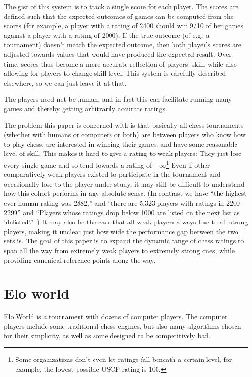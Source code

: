 \documentclass[10pt,preprint,twocolumn]{acmart}
\begin{document}
The gist of this system is to track a single score for each player.
The scores are defined such that the expected outcomes of games can be
computed from the scores (for example, a player with a rating of 2400
should win 9/10 of her games against a player with a rating of 2000).
If the true outcome (of e.g.~a tournament) doesn't match the expected
outcome, then both player's scores are adjusted towards values that
would have produced the expected result. Over time, scores thus become
a more accurate reflection of players' skill, while also allowing for
players to change skill level. This system is carefully described
elsewhere, so we can just leave it at that.

The players need not be human, and in fact this can facilitate running
many games and thereby getting arbitrarily accurate ratings.

The problem this paper is concerned with is that basically all chess
tournaments (whether with humans or computers or both) are between
players who know how to play chess, are interested in winning their
games, and have some reasonable level of skill. This makes it hard to
give a rating to weak players: They just lose every single game and so
tend towards a rating of $-\infty$\footnote{Some organizations don't
  even let ratings fall beneath a certain level, for example, the
  lowest possible USCF rating is 100.} Even if other comparatively
weak players existed to participate in the tournament and occasionally
lose to the player under study, it may still be difficult to
understand how this cohort performs in any absolute sense. (In
contrast we have ``the highest ever human rating was 2882,'' and
``there are 5,323 players with ratings in 2200--2299'' and ``Players
whose ratings drop below 1000 are listed on the next list as
'delisted'.''~\cite{fideratings}) It may also be the case that all
weak players always lose to all strong players, making it unclear just
how wide the performance gap between the two sets is. The goal of
this paper is to expand the dynamic range of chess ratings to span
all the way from extremely weak players to extremely strong ones, while
providing canonical reference points along the way.

\section{Elo world}

Elo World is a tournament with dozens of computer players. The
computer players include some traditional chess engines, but also many
algorithms chosen for their simplicity, as well as some designed to
be competitively bad.
\end{document}
